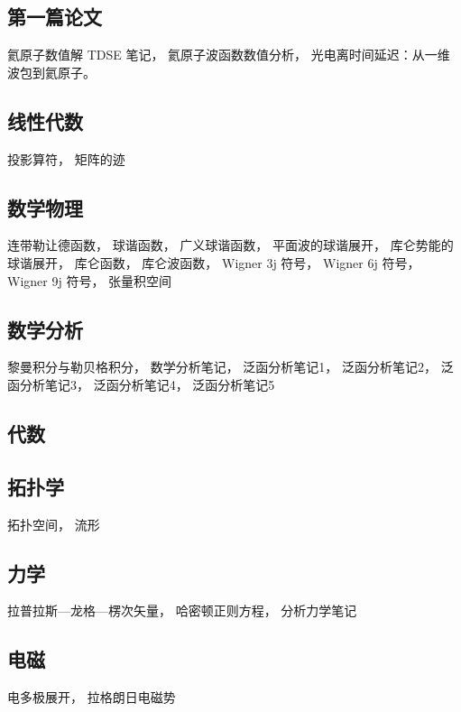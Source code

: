 
\subsection{第一篇论文}
氦原子数值解 TDSE 笔记， 氦原子波函数数值分析， 光电离时间延迟：从一维波包到氦原子。

\subsection{线性代数}
投影算符， 矩阵的迹

\subsection{数学物理}
连带勒让德函数， 球谐函数， 广义球谐函数， 平面波的球谐展开， 库仑势能的球谐展开， 库仑函数， 库仑波函数， Wigner 3j 符号， Wigner 6j 符号， Wigner 9j 符号， 张量积空间

\subsection{数学分析}
黎曼积分与勒贝格积分， 数学分析笔记， 泛函分析笔记1， 泛函分析笔记2， 泛函分析笔记3， 泛函分析笔记4， 泛函分析笔记5

\subsection{代数}

\subsection{拓扑学}
拓扑空间， 流形

\subsection{力学}
拉普拉斯—龙格—楞次矢量， 哈密顿正则方程， 分析力学笔记

\subsection{电磁}
电多极展开， 拉格朗日电磁势

